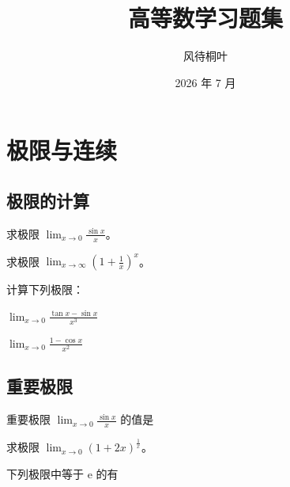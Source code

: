 \documentclass[answers]{kiritex}
\title{高等数学习题集}
\author{风待桐叶}
\date{2026 年 7 月}
\begin{document}
\maketitle

\tableofcontents
\newpage

\section{极限与连续}

\subsection{极限的计算}

\begin{problem}
  求极限 $\displaystyle\lim_{x\to 0}\frac{\sin x}{x}$。
\end{problem}

\begin{problem}
  求极限 $\displaystyle\lim_{x\to\infty}\left(1+\frac{1}{x}\right)^x$。
\end{problem}

\begin{problem}
  计算下列极限：
  \begin{problemsubparts}
    \item $\displaystyle\lim_{x\to 0}\frac{\tan x-\sin x}{x^3}$
    \item $\displaystyle\lim_{x\to 0}\frac{1-\cos x}{x^2}$
  \end{problemsubparts}
\end{problem}

\subsection{重要极限}

\begin{problem}
  重要极限 $\displaystyle\lim_{x\to 0}\frac{\sin x}{x}$ 的值是 \problemblock*
\end{problem}

\begin{problem}
  求极限 $\displaystyle\lim_{x\to 0}(1+2x)^{\frac{1}{x}}$。
\end{problem}

\begin{problemchoice}
  下列极限中等于 $\mathrm{e}$ 的有
\end{problemchoice}
\end{document}

